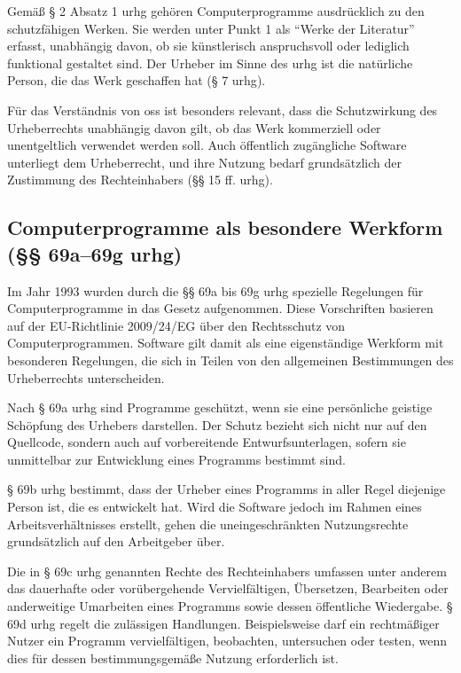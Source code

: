 Gemäß § 2 Absatz 1 \gls{urhg} gehören Computerprogramme ausdrücklich zu den schutzfähigen Werken.
Sie werden unter Punkt 1 als \enquote{Werke der Literatur} erfasst, unabhängig davon, ob sie künstlerisch anspruchsvoll oder lediglich funktional gestaltet sind.
Der Urheber im Sinne des \gls{urhg} ist die natürliche Person, die das Werk geschaffen hat (§ 7 \gls{urhg}).

Für das Verständnis von \gls{oss} ist besonders relevant, dass die Schutzwirkung des Urheberrechts unabhängig davon gilt, ob das Werk kommerziell oder unentgeltlich verwendet werden soll.
Auch öffentlich zugängliche Software unterliegt dem Urheberrecht, und ihre Nutzung bedarf grundsätzlich der Zustimmung des Rechteinhabers (§§ 15 ff. \gls{urhg}).


\subsection{Computerprogramme als besondere Werkform (§§ 69a–69g \gls{urhg})}

Im Jahr 1993 wurden durch die §§ 69a bis 69g \gls{urhg} spezielle Regelungen für Computerprogramme in das Gesetz aufgenommen.
Diese Vorschriften basieren auf der EU-Richtlinie 2009/24/EG über den Rechtsschutz von Computerprogrammen.
Software gilt damit als eine eigenständige Werkform mit besonderen Regelungen, die sich in Teilen von den allgemeinen Bestimmungen des Urheberrechts unterscheiden.

Nach § 69a \gls{urhg} sind Programme geschützt, wenn sie eine persönliche geistige Schöpfung des Urhebers darstellen.
Der Schutz bezieht sich nicht nur auf den Quellcode, sondern auch auf vorbereitende Entwurfsunterlagen, sofern sie unmittelbar zur Entwicklung eines Programms bestimmt sind.

§ 69b \gls{urhg} bestimmt, dass der Urheber eines Programms in aller Regel diejenige Person ist, die es entwickelt hat.
Wird die Software jedoch im Rahmen eines Arbeitsverhältnisses erstellt, gehen die uneingeschränkten Nutzungsrechte grundsätzlich auf den Arbeitgeber über.

Die in § 69c \gls{urhg} genannten Rechte des Rechteinhabers umfassen unter anderem das dauerhafte oder vorübergehende Vervielfältigen, Übersetzen, Bearbeiten oder anderweitige Umarbeiten eines Programms sowie dessen öffentliche Wiedergabe.
§ 69d \gls{urhg} regelt die zulässigen Handlungen.
Beispielsweise darf ein rechtmäßiger Nutzer ein Programm vervielfältigen, beobachten, untersuchen oder testen, wenn dies für dessen bestimmungsgemäße Nutzung erforderlich ist.

